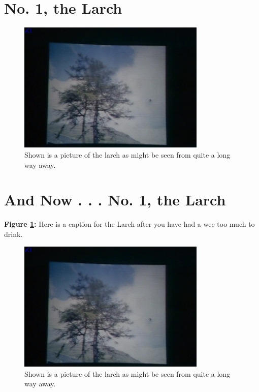 \documentclass[10pt,chapterheads]{ucsd}
\begin{document}
\section{No. 1, the Larch}
\begin{figure}[ht] 
  \centering
  \includegraphics[width=0.8\textwidth]{larch}
  \caption{Shown is a picture of the larch as might be seen from quite a long way away.}
\end{figure}

\section{And Now . . . No. 1, the Larch}
\newpage
\thispagestyle{facingcap}
\begin{center}
\vspace*{3in}
\textbf{Figure \ref{Sideways Larch}:} Here is a caption for the Larch after you have had a wee too much to drink.

\end{center}
\newpage

\begin{figure}[hb] 
  \centering
  \includegraphics[width=0.8\textwidth]{larch}
  \caption[No. 1 The Larch]{Shown is a picture of the larch as might be seen from quite a long way away.}\label{Sideways Larch}
\end{figure}
\end{document}
